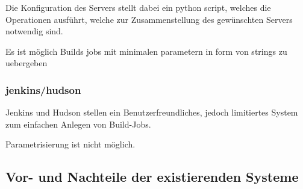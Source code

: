 Die Konfiguration des Servers stellt dabei ein python script,
welches die Operationen ausführt, welche zur Zusammenstellung des gewünschten Servers notwendig sind.

Es ist möglich Builds jobs mit minimalen parametern in form von strings zu uebergeben

\subsubsection{jenkins/hudson}

Jenkins und Hudson stellen ein Benutzerfreundliches,
jedoch limitiertes System zum einfachen Anlegen von Build-Jobs.

Parametrisierung ist nicht möglich.

\subsection{Vor- und Nachteile der existierenden Systeme}
